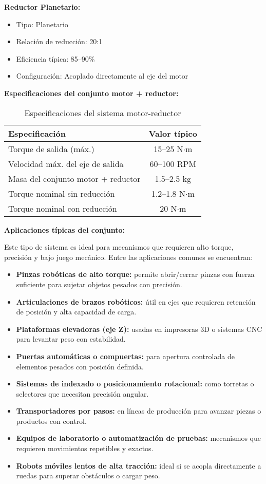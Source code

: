 \textbf{Reductor Planetario:}

\begin{itemize}
	\item Tipo: Planetario
	\item Relación de reducción: 20:1
	\item Eficiencia típica: 85–90\%
	\item Configuración: Acoplado directamente al eje del motor
\end{itemize}

\textbf{Especificaciones del conjunto motor + reductor:}

\begin{table}[H]
	\centering
	\caption{Especificaciones del sistema motor-reductor}
	\begin{tabular}{|l|c|}
		\hline
		\textbf{Especificación} & \textbf{Valor típico} \\
		\hline
		Torque de salida (máx.) & 15–25 N$\cdot$m \\
		Velocidad máx. del eje de salida & 60–100 RPM \\
		Masa del conjunto motor + reductor & 1.5–2.5 kg \\
		Torque nominal sin reducción & 1.2–1.8 N$\cdot$m \\
		Torque nominal con reducción & 20 N$\cdot$m \\
		\hline
	\end{tabular}
\end{table}

\textbf{Aplicaciones típicas del conjunto:}

Este tipo de sistema es ideal para mecanismos que requieren alto torque, precisión y bajo juego mecánico. Entre las aplicaciones comunes se encuentran:

\begin{itemize}
	\item \textbf{Pinzas robóticas de alto torque:} permite abrir/cerrar pinzas con fuerza suficiente para sujetar objetos pesados con precisión.
	\item \textbf{Articulaciones de brazos robóticos:} útil en ejes que requieren retención de posición y alta capacidad de carga.
	\item \textbf{Plataformas elevadoras (eje Z):} usadas en impresoras 3D o sistemas CNC para levantar peso con estabilidad.
	\item \textbf{Puertas automáticas o compuertas:} para apertura controlada de elementos pesados con posición definida.
	\item \textbf{Sistemas de indexado o posicionamiento rotacional:} como torretas o selectores que necesitan precisión angular.
	\item \textbf{Transportadores por pasos:} en líneas de producción para avanzar piezas o productos con control.
	\item \textbf{Equipos de laboratorio o automatización de pruebas:} mecanismos que requieren movimientos repetibles y exactos.
	\item \textbf{Robots móviles lentos de alta tracción:} ideal si se acopla directamente a ruedas para superar obstáculos o cargar peso.
\end{itemize}


